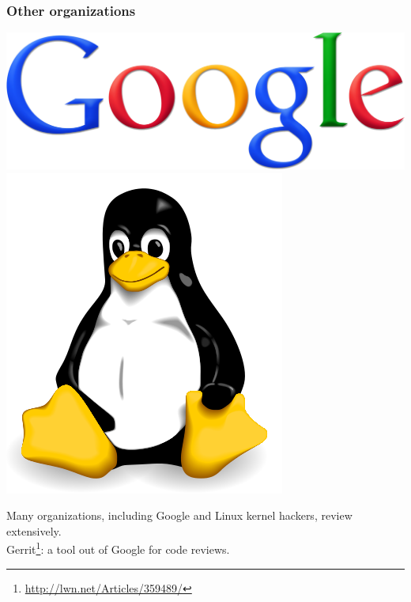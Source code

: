 \begin{frame}
\frametitle{Other organizations}

\begin{center}
\includegraphics[width=.4\textwidth]{images/Googlelogo.png} \quad
\includegraphics[width=.4\textwidth]{images/Tux.png}
\end{center}
\begin{changemargin}{1cm}
Many organizations, including Google and Linux kernel hackers,
review extensively.\\

Gerrit\footnote{\url{http://lwn.net/Articles/359489/}}: a tool out of
Google for code reviews.

\end{changemargin}

\end{frame}



